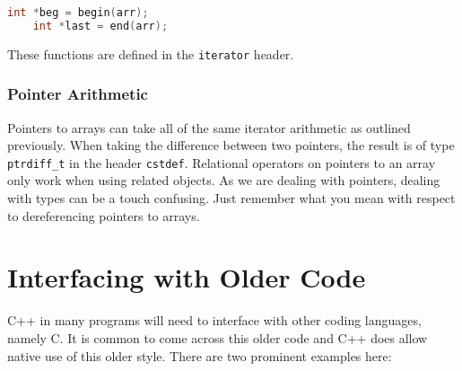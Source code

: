 \documentclass[12pt, a4paper]{report}
\begin{document}
\begin{lstlisting}[language=C++]
    int *beg = begin(arr);
    int *last = end(arr);
\end{lstlisting}

These functions are defined in the \verb|iterator| header.

\subsubsection{Pointer Arithmetic}
Pointers to arrays can take all of the same iterator arithmetic as outlined previously.
When taking the difference between two pointers, the result is of type \verb|ptrdiff_t| in the header \verb|cstdef|.
Relational operators on pointers to an array only work when using related objects.
As we are dealing with pointers, dealing with types can be a touch confusing.
Just remember what you mean with respect to dereferencing pointers to arrays.
\section{Interfacing with Older Code}
C++ in many programs will need to interface with other coding languages, namely C.
It is common to come across this older code and C++ does allow native use of this older style.
There are two prominent examples here:
\end{document}
